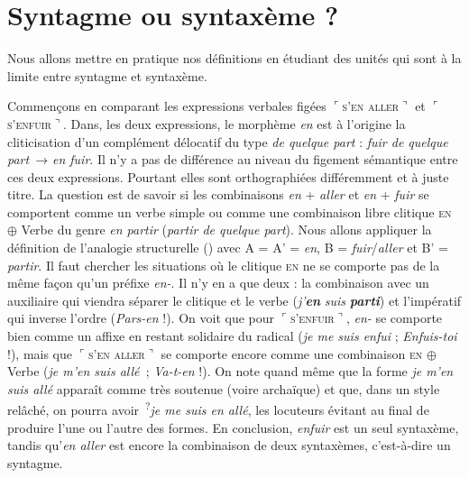 \section{Syntagme ou syntaxème ?}\label{sec:3.1.4}

Nous allons mettre en pratique nos définitions en étudiant des unités qui sont à la limite entre syntagme et syntaxème.

Commençons en comparant les expressions verbales figées $⌜$\textsc{s’en} \textsc{aller}$⌝$ et $⌜$\textsc{s’enfuir}$⌝$. Dans, les deux expressions, le morphème \textit{en} est à l’origine la cliticisation d’un complément délocatif du type \textit{de quelque part} : \textit{fuir de quelque part~}→ \textit{en fuir}. Il n’y a pas de différence au niveau du figement sémantique entre ces deux expressions. Pourtant elles sont orthographiées différemment et à juste titre. La question est de savoir si les combinaisons \textit{en} + \textit{aller} et \textit{en} + \textit{fuir} se comportent comme un verbe simple ou comme une combinaison libre clitique \textsc{en} ${\oplus}$ Verbe du genre \textit{en partir} (\textit{partir de quelque part}). Nous allons appliquer la définition de l’analogie structurelle () avec A = A’ = \textit{en}, B = \textit{fuir}/\textit{aller} et B’ = \textit{partir}. Il faut chercher les situations où le clitique \textsc{en} ne se comporte pas de la même façon qu’un préfixe \textit{en-}. Il n’y en a que deux : la combinaison avec un auxiliaire qui viendra séparer le clitique et le verbe (\textit{j’}\textbf{\textit{en}} \textit{suis} \textbf{\textit{parti}}) et l’impératif qui inverse l’ordre (\textit{Pars-en} !). On voit que pour $⌜$\textsc{s’enfuir}$⌝$, \textit{en-} se comporte bien comme un affixe en restant solidaire du radical (\textit{je me suis enfui} ; \textit{Enfuis-toi} !), mais que $⌜$\textsc{s’en} \textsc{aller}$⌝$ se comporte encore comme une combinaison \textsc{en} ${\oplus}$ Verbe (\textit{je m’en suis allé~}; \textit{Va-t-en} !). On note quand même que la forme \textit{je m’en suis allé} apparaît comme très soutenue (voire archaïque) et que, dans un style relâché, on pourra avoir~\textsuperscript{?}\textit{je me suis en allé}, les locuteurs évitant au final de produire l’une ou l’autre des formes. En conclusion, \textit{enfuir} est un seul syntaxème, tandis qu’\textit{en aller} est encore la combinaison de deux syntaxèmes, c’est-à-dire un syntagme.

